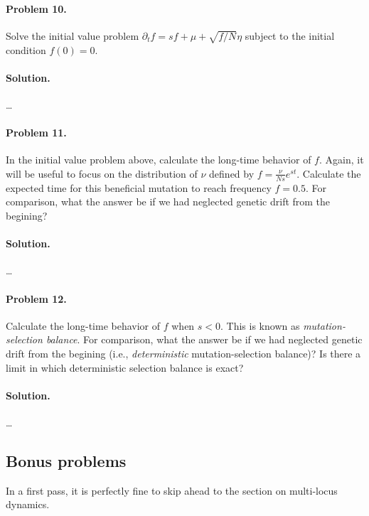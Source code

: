 \documentclass[11pt]{article}
\begin{document}
\paragraph{Problem 10.} Solve the initial value problem $\partial_t f = s f + \mu + \sqrt{f/N} \eta$ subject to the initial condition $f(0)=0$. 

\paragraph{Solution.} \ldots

\paragraph{Problem 11.} In the initial value problem above, calculate the long-time behavior of $f$. Again, it will be useful to focus on the distribution of $\nu$ defined by $f = \frac{\nu}{Ns} e^{st}$. Calculate the expected time for this beneficial mutation to reach frequency $f=0.5$. For comparison, what the answer be if we had neglected genetic drift from the begining? 

\paragraph{Solution.} \ldots

\paragraph{Problem 12.} Calculate the long-time behavior of $f$ when $s < 0$. This is known as \emph{mutation-selection balance}. For comparison, what the answer be if we had neglected genetic drift from the begining (i.e., \emph{deterministic} mutation-selection balance)? Is there a limit in which deterministic selection balance is exact?  

\paragraph{Solution.} \ldots

\subsection*{Bonus problems}

In a first pass, it is perfectly fine to skip ahead to the section on multi-locus dynamics. 
\end{document}
